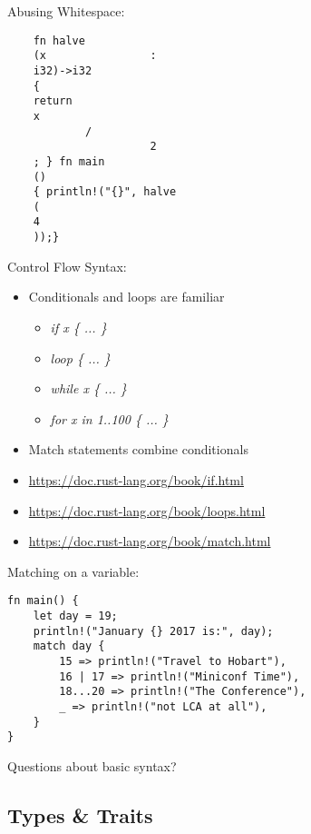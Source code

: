 \documentclass[aspectratio=169]{beamer}
\begin{document}
\begin{frame}[fragile]
    Abusing Whitespace:

\begin{verbatim}
    fn halve
    (x                :
    i32)->i32
    {
    return
    x
            /
                      2
    ; } fn main
    ()
    { println!("{}", halve
    (
    4
    ));}
\end{verbatim}

\end{frame}

\begin{frame}
    Control Flow Syntax:
    \begin{itemize}
        \item Conditionals and loops are familiar
        \begin{itemize}
            \item \textit{if x \{ ... \}}
            \item \textit{loop \{ ... \}}
            \item \textit{while x \{ ... \}}
            \item \textit{for x in 1..100 \{ ... \}}
        \end{itemize}
        \item Match statements combine conditionals
        \item \url{https://doc.rust-lang.org/book/if.html}
        \item \url{https://doc.rust-lang.org/book/loops.html}
        \item \url{https://doc.rust-lang.org/book/match.html}
    \end{itemize}
\end{frame}

\begin{frame}[fragile]
Matching on a variable:
\begin{verbatim}
fn main() {
    let day = 19;
    println!("January {} 2017 is:", day);
    match day {
        15 => println!("Travel to Hobart"),
        16 | 17 => println!("Miniconf Time"),
        18...20 => println!("The Conference"),
        _ => println!("not LCA at all"),
    }
}
\end{verbatim}
\end{frame}
\begin{frame}
    \hfill Questions about basic syntax?
\end{frame}


\subsection{Types \& Traits}
\end{document}
